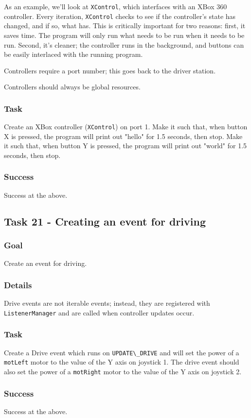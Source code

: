 \documentclass[a4paper]{article}
\begin{document}
As an example, we'll look at \lstinline{XControl}, which interfaces with an XBox 360 controller. Every iteration, \lstinline{XControl} checks to see if the controller's state has changed, and if so, what has. This is critically important for two reasons: first, it saves time. The program will only run what needs to be run when it needs to be run. Second, it's cleaner; the controller runs in the background, and buttons can be easily interlaced with the running program.

Controllers require a port number; this goes back to the driver station. 

Controllers should always be global resources.
\subsubsection{Task} Create an XBox controller (\lstinline{XControl}) on port 1. Make it such that, when button X is pressed, the program will print out "hello" for 1.5 seconds, then stop. Make it such that, when button Y is pressed, the program will print out "world" for 1.5 seconds, then stop.
\subsubsection{Success} Success at the above.

\subsection{Task 21 - Creating an event for driving}
\subsubsection{Goal} Create an event for driving.
\subsubsection{Details} Drive events are not iterable events; instead, they are registered with \lstinline{ListenerManager} and are called when controller updates occur. 
\subsubsection{Task} Create a Drive event which runs on \lstinline{UPDATE\_DRIVE} and will set the power of a \lstinline{motLeft} motor to the value of the Y axis on joystick 1. The drive event should also set the power of a \lstinline{motRight} motor to the value of the Y axis on joystick 2.
\subsubsection{Success} Success at the above.
\end{document}
